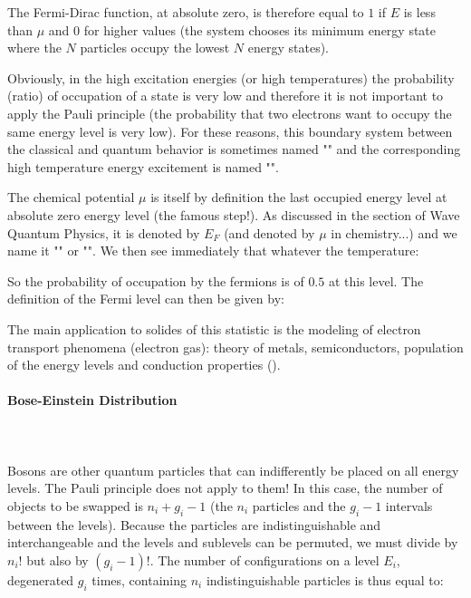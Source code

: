 	The Fermi-Dirac function, at absolute zero, is therefore equal to $1$ if $E$ is less than $\mu$ and $0$ for higher values (the system chooses its minimum energy state where the $N$ particles occupy the lowest $N$ energy states).

	Obviously, in the high excitation energies (or high temperatures) the probability (ratio) of occupation of a state is very low and therefore it is not important to apply the Pauli principle (the probability that two electrons want to occupy the same energy level is very low). For these reasons, this boundary system between the classical and quantum behavior is sometimes named "" and the corresponding high temperature energy excitement is named "".

	The chemical potential $\mu$ is itself by definition the last occupied energy level at absolute zero energy level (the famous step!). As discussed in the section of Wave Quantum Physics, it is denoted by $E_F$ (and denoted by $\mu$ in chemistry...) and we name it "" or "". We then see immediately that whatever the temperature:
	
	So the probability of occupation by the fermions is of  $0.5$ at this level. The definition of the Fermi level can then be given by:
	
	The main application to solides of this statistic is the  modeling of electron transport phenomena (electron gas): theory of metals, semiconductors, population of the energy levels and conduction properties ().
	
	\paragraph{Bose-Einstein Distribution}\mbox{}\\\\
	Bosons are other quantum particles that can indifferently be placed on all energy levels. The Pauli principle does not apply to them! In this case, the number of objects to be swapped is $n_i+g_i-1$ (the $n_i$ particles and the $g_i-1$ intervals between the levels). Because the particles are indistinguishable and interchangeable and the levels and sublevels can be permuted, we must divide by $n_i!$ but also by $(g_i-1)!$. The number of configurations on a level $E_i$,  degenerated $g_i$ times, containing $n_i$ indistinguishable particles is thus equal to:
	
